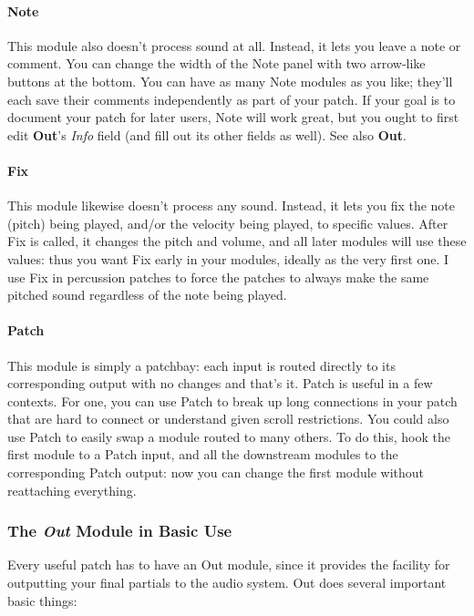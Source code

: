 \documentclass{article}
\begin{document}
\paragraph{Note} This module also doesn't process sound at all. Instead, it lets you leave a note or comment.  You can change the width of the Note panel with two arrow-like buttons at the bottom.   You can have as many Note modules as you like; they'll each save their comments independently as part of your patch.  If your goal is to document your patch for later users, Note will work great, but you ought to first edit {\bf Out}'s {\it Info} field (and fill out its other fields as well).  See also {\bf Out}.

\paragraph{Fix} This module likewise doesn't process any sound.  Instead, it lets you fix the note (pitch) being played, and/or the velocity being played, to specific values.  After Fix is called, it changes the pitch and volume, and all later modules will use these values: thus you want Fix early in your modules, ideally as the very first one.  I use Fix in percussion patches to force the patches to always make the same pitched sound regardless of the note being played.

\paragraph{Patch} This module is simply a patchbay: each input is routed directly to its corresponding output with no changes and that's it.  Patch is useful in a few contexts.  For one, you can use Patch to break up long connections in your patch that are hard to connect or understand given scroll restrictions. You could also use Patch to easily swap a module routed to many others.  To do this, hook the first module to a Patch input, and all the downstream modules to the corresponding Patch output: now you can change the first module without reattaching everything.

\subsubsection{The \textit{Out} Module in Basic Use}  
\label{outmodule}

Every useful patch has to have an Out module, since it provides the facility for outputting your final partials to the audio system.  Out does several important basic things:
\end{document}
